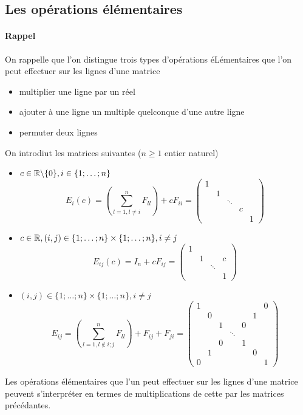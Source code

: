 %
\subsection{Les opérations élémentaires}
%
\paragraph{Rappel} On rappelle que l'on distingue trois types d'opérations éLémentaires que l'on peut effectuer sur les lignes d'une matrice
\begin{itemize}
  \item multiplier une ligne par un réel
  \item ajouter à une ligne un multiple quelconque d'une autre ligne
  \item permuter deux lignes
\end{itemize}
On introdiut les matrices suivantes ($n \geq 1$ entier naturel)
\begin{itemize}
  \item $c \in \mathbb{R} \backslash \{0 \}, i \in \{1; \ldots; n\}$
    $$E_i(c) = \left( \sum_{l=1, l\neq i}^n F_{ll} \right) +  c F_{ii} = 
      \begin{pmatrix}
        1 & & \\
        & 1 & \\
        & & \ddots & \\
        & & & c & \\
        & & & & 1
      \end{pmatrix}$$
      
  \item $c \in \mathbb{R}, (i, j) \in \{1;\ldots;n\}\times\{1;\ldots;n\}, i\neq j$
    $$E_{ij}(c) = I_n + c F_{ij} =
      \begin{pmatrix}
        1 & & & \\
        & 1 & & c \\
        & & \ddots & \\
        & & & 1
      \end{pmatrix}$$
      
  \item $(i, j) \in \{1; \ldots; n\}\times\{1;\ldots; n\}, i\neq j$
    $$E_{ij} = \left( \sum_{l=1, l \notin {i; j}}^n F_{ll} \right) + F_{ij} + F_{ji} = 
      \begin{pmatrix}
        1 & & & & & & 0 \\
        & 0 & & & & 1 & \\
        & & 1 & & 0 & & \\
        & & & \ddots & & & \\
        & & 0 & & 1 & & \\
        & 1 & & & & 0 & \\
        0 & & & & & & 1
      \end{pmatrix}$$
\end{itemize} 
Les opérations élémentaires que l'un peut effectuer sur les lignes d'une matrice peuvent s'interpréter en termes de multiplications de cette par les matrices précédantes.

